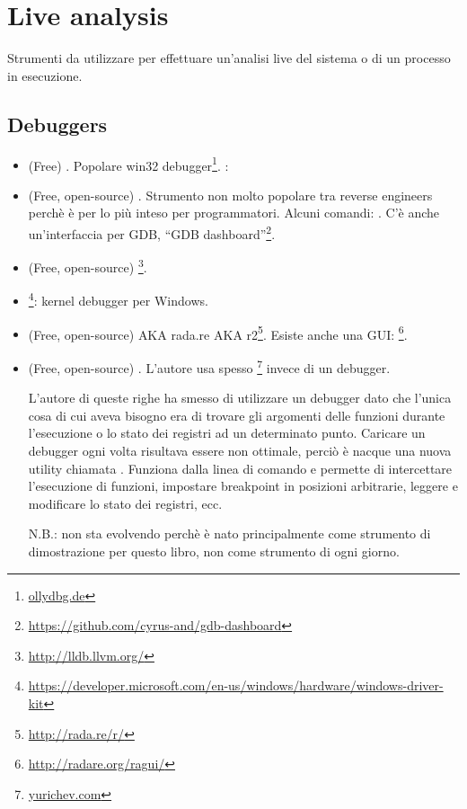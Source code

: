 \section{Live analysis}

Strumenti da utilizzare per effettuare un'analisi live del sistema o di un processo in esecuzione.

\subsection{Debuggers}

\myindex{\olly}

\begin{itemize}
\item (Free) .
Popolare win32 debugger\footnote{\href{http://go.yurichev.com/17032}{ollydbg.de}}.
\ShortHotKeyCheatsheet: 

\item (Free, open-source) .
Strumento non molto popolare tra reverse engineers perchè è per lo più inteso per programmatori.
Alcuni comandi: .
C'è anche un'interfaccia per GDB, ``GDB dashboard''\footnote{\url{https://github.com/cyrus-and/gdb-dashboard}}.

\item (Free, open-source) \footnote{\url{http://lldb.llvm.org/}}.

\item {}\footnote{\url{https://developer.microsoft.com/en-us/windows/hardware/windows-driver-kit}}:
kernel debugger per Windows.

\item (Free, open-source)  \ac{AKA} rada.re \ac{AKA} r2\footnote{\url{http://rada.re/r/}}.
Esiste anche una GUI: \footnote{\url{http://radare.org/ragui/}}.

\item (Free, open-source) .
\label{tracer}
L'autore usa spesso 
\footnote{\href{http://go.yurichev.com/17338}{yurichev.com}}
invece di un debugger.

L'autore di queste righe ha smesso di utilizzare un debugger dato che l'unica cosa di cui aveva bisogno era di trovare gli
argomenti delle funzioni durante l'esecuzione o lo stato dei registri ad un determinato punto.
Caricare un debugger ogni volta risultava essere non ottimale, perciò è nacque una nuova utility chiamata .
Funziona dalla linea di comando e permette di intercettare l'esecuzione di funzioni,
impostare breakpoint in posizioni arbitrarie, leggere e modificare lo stato dei registri, ecc.

N.B.:  non sta evolvendo perchè è nato principalmente come strumento di dimostrazione per questo libro, non come strumento di ogni giorno.
\end{itemize}

